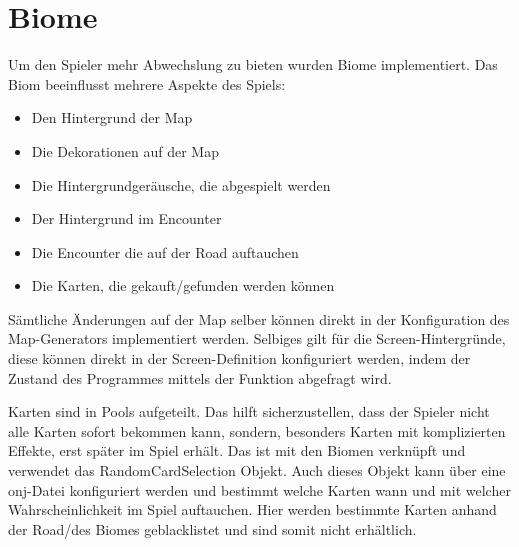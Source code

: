 
\section{Biome}\label{sec:biome}

\renewcommand{\kapitelautor}{Autor: Marvin Kurka}

Um den Spieler mehr Abwechslung zu bieten wurden Biome implementiert.
Das Biom beeinflusst mehrere Aspekte des Spiels:

\begin{itemize}
    \item Den Hintergrund der Map
    \item Die Dekorationen auf der Map
    \item Die Hintergrundgeräusche, die abgespielt werden
    \item Der Hintergrund im Encounter
    \item Die Encounter die auf der Road auftauchen
    \item Die Karten, die gekauft/gefunden werden können
\end{itemize}

Sämtliche Änderungen auf der Map selber können direkt in der Konfiguration des Map-Generators implementiert werden.
Selbiges gilt für die Screen-Hintergründe, diese können direkt in der Screen-Definition konfiguriert werden, indem
der Zustand des Programmes mittels der  Funktion abgefragt wird.

Karten sind in Pools aufgeteilt.
Das hilft sicherzustellen, dass der Spieler nicht alle Karten sofort bekommen kann, sondern, besonders Karten mit
komplizierten Effekte, erst später im Spiel erhält.
Das ist mit den Biomen verknüpft und verwendet das RandomCardSelection Objekt.
Auch dieses Objekt kann über eine onj-Datei konfiguriert werden und bestimmt welche Karten wann und mit welcher
Wahrscheinlichkeit im Spiel auftauchen.
Hier werden bestimmte Karten anhand der Road/des Biomes geblacklistet und sind somit nicht erhältlich.

\renewcommand{\kapitelautor}{}
